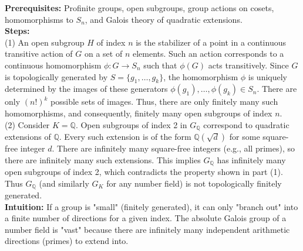 \begin{solution}
\textbf{Prerequisites:} Profinite groups, open subgroups, group actions on cosets, homomorphisms to $S_n$, and Galois theory of quadratic extensions. \\[2ex]

\textbf{Steps:} \\[2ex]
(1) An open subgroup $H$ of index $n$ is the stabilizer of a point in a continuous transitive action of $G$ on a set of $n$ elements. Such an action corresponds to a continuous homomorphism $\phi: G \to S_n$ such that $\phi(G)$ acts transitively. Since $G$ is topologically generated by $S = \{g_1, \dots, g_k\}$, the homomorphism $\phi$ is uniquely determined by the images of these generators $\phi(g_1), \dots, \phi(g_k) \in S_n$. There are only $(n!)^k$ possible sets of images. Thus, there are only finitely many such homomorphisms, and consequently, finitely many open subgroups of index $n$. \\[2ex]

(2) Consider $K = \mathbb{Q}$. Open subgroups of index 2 in $G_{\mathbb{Q}}$ correspond to quadratic extensions of $\mathbb{Q}$. Every such extension is of the form $\mathbb{Q}(\sqrt{d})$ for some square-free integer $d$. There are infinitely many square-free integers (e.g., all primes), so there are infinitely many such extensions. This implies $G_{\mathbb{Q}}$ has infinitely many open subgroups of index 2, which contradicts the property shown in part (1). Thus $G_{\mathbb{Q}}$ (and similarly $G_K$ for any number field) is not topologically finitely generated. \\[2ex]

\textbf{Intuition:} If a group is "small" (finitely generated), it can only "branch out" into a finite number of directions for a given index. The absolute Galois group of a number field is "vast" because there are infinitely many independent arithmetic directions (primes) to extend into.
\end{solution}

